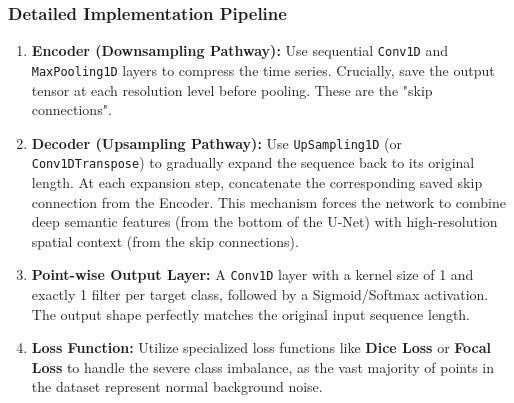 \subsubsection*{Detailed Implementation Pipeline}
\begin{enumerate}
    \item \textbf{Encoder (Downsampling Pathway):} Use sequential \texttt{Conv1D} and \texttt{MaxPooling1D} layers to compress the time series. Crucially, save the output tensor at each resolution level before pooling. These are the "skip connections".
    \item \textbf{Decoder (Upsampling Pathway):} Use \texttt{UpSampling1D} (or \texttt{Conv1DTranspose}) to gradually expand the sequence back to its original length. At each expansion step, concatenate the corresponding saved skip connection from the Encoder. This mechanism forces the network to combine deep semantic features (from the bottom of the U-Net) with high-resolution spatial context (from the skip connections).
    \item \textbf{Point-wise Output Layer:} A \texttt{Conv1D} layer with a kernel size of 1 and exactly 1 filter per target class, followed by a Sigmoid/Softmax activation. The output shape perfectly matches the original input sequence length.
    \item \textbf{Loss Function:} Utilize specialized loss functions like \textbf{Dice Loss} or \textbf{Focal Loss} to handle the severe class imbalance, as the vast majority of points in the dataset represent normal background noise.
\end{enumerate}


